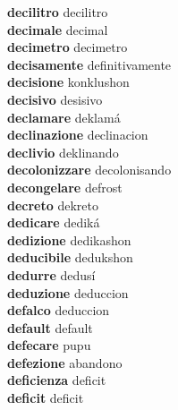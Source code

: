 \textbf{decilitro } decilitro \\
\textbf{decimale } decimal \\
\textbf{decimetro } decimetro \\
\textbf{decisamente } definitivamente \\
\textbf{decisione } konklushon \\
\textbf{decisivo } desisivo \\
\textbf{declamare } deklamá \\
\textbf{declinazione } declinacion \\
\textbf{declivio } deklinando \\
\textbf{decolonizzare } decolonisando \\
\textbf{decongelare } defrost \\
\textbf{decreto } dekreto \\
\textbf{dedicare } dediká \\
\textbf{dedizione } dedikashon \\
\textbf{deducibile } dedukshon \\
\textbf{dedurre } dedusí \\
\textbf{deduzione } deduccion \\
\textbf{defalco } deduccion \\
\textbf{default } default \\
\textbf{defecare } pupu \\
\textbf{defezione } abandono \\
\textbf{deficienza } deficit \\
\textbf{deficit } deficit \\
